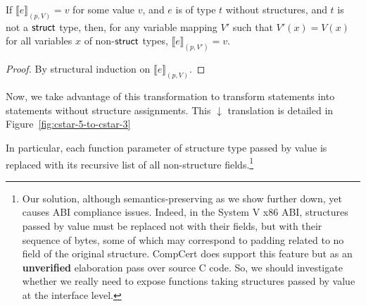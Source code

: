 \begin{lemma} \label{lemma-cstar-expr-struct-erase-non-struct}
  If $\llbracket e \rrbracket_{(p,V)} = v$ for some value $v$, and $e$
  is of type $t$ without structures, and $t$ is not a $\text{\textsf{struct}}$
  type, then, for any variable mapping $V'$ such that $V'(x) = V(x)$
  for all variables $x$ of non-$\text{\textsf{struct}}$ types, $\llbracket e
  \rrbracket_{(p,V')} = v$.
\end{lemma}
\begin{proof}
  By structural induction on $\llbracket e \rrbracket_{(p,V)}$.
\end{proof}

Now, we take advantage of this transformation to transform 
statements into  statements without structure assignments.  This
$\downarrow$ translation is detailed in
Figure~\ref{fig:cstar-5-to-cstar-3}

In particular, each function parameter of structure type passed by
value is replaced with its recursive list of all non-structure
fields.\footnote{Our solution, although semantics-preserving as we
  show further down, yet causes ABI compliance issues. Indeed, in the
  System V x86 ABI, structures passed by value must be replaced not
  with their fields, but with their sequence of bytes, some of which
  may correspond to padding related to no field of the original
  structure. CompCert does support this feature but as an
  \textbf{unverified} elaboration pass over source C code. So, we
  should investigate whether we really need to expose functions taking
  structures passed by value at the interface level.}

